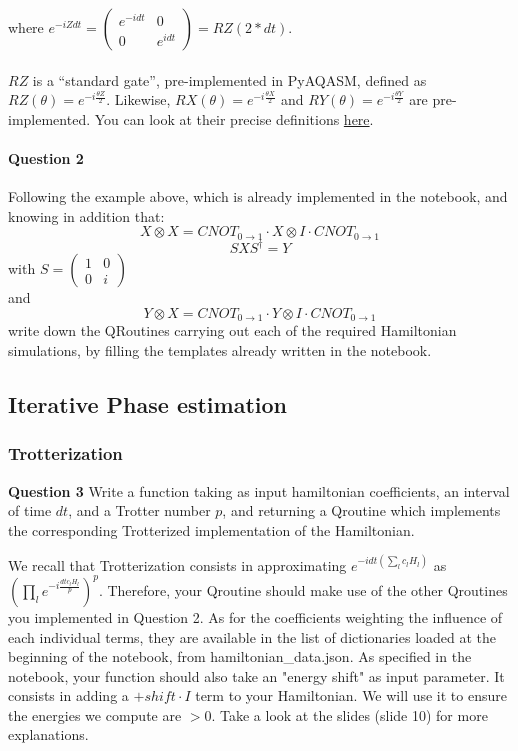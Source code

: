 \documentclass{article}
\begin{document}
where $e^{-iZdt} = \begin{pmatrix} e^{-idt} & 0 \\ 0 & e^{idt} \end{pmatrix} = RZ(2*dt)$.

\paragraph{} $RZ$ is a ``standard gate'', pre-implemented in PyAQASM, defined as $RZ(\theta)=e^{-i\frac{\theta Z}{2}}$.
Likewise, $RX(\theta) = e^{-i\frac{\theta X}{2}}$ and 
$RY(\theta)=e^{-i\frac{\theta Y}{2}}$ are pre-implemented. You can look at their precise definitions
\textcolor{blue}{\href{https://myqlm.github.io/aqasm.html\#aqasm}{here}}.

\paragraph{Question 2} Following the example above, which is already implemented in the notebook, and knowing in addition that:
$$ X\otimes X = CNOT_{0\rightarrow 1} \cdot X\otimes I \cdot 
CNOT_{0\rightarrow 1}  $$
$$ SXS^{\dagger} = Y $$ with $S=\begin{pmatrix}1 & 0 \\ 0 & i \end{pmatrix}$ \\and 
$$ Y\otimes X = CNOT_{0\rightarrow 1} \cdot Y\otimes I \cdot 
CNOT_{0\rightarrow 1} $$
write down the QRoutines carrying out each of the required 
Hamiltonian simulations, by filling the templates already written
in the notebook. 

\subsection{Iterative Phase estimation}

\subsubsection{Trotterization}

\textbf{Question 3} Write a function taking as input hamiltonian
coefficients, an interval of time $dt$,  and a Trotter number $p$, 
and returning a Qroutine which implements the corresponding
Trotterized implementation of the Hamiltonian.

We recall that Trotterization consists in approximating $e^{-idt\left(\sum_{l}c_{l}H_{l}\right)}$ as
$\left(\prod_{l}e^{-i\frac{dt c_{l} H_{l}}{p}}\right)^{p}$. Therefore, your Qroutine should make use of
the other Qroutines you implemented in Question 2. As for the coefficients weighting the influence
of each individual terms, they are available in the list of dictionaries loaded at the beginning
of the notebook, from {\selectfont hamiltonian\_data.json}. As specified in the notebook,
your function should also take an "energy shift" as input parameter. It consists in adding a $+shift\cdot I$
term to your Hamiltonian. We will use it to ensure the energies we compute are $>0$. Take a look at the 
slides (slide 10) for more explanations.
\end{document}
